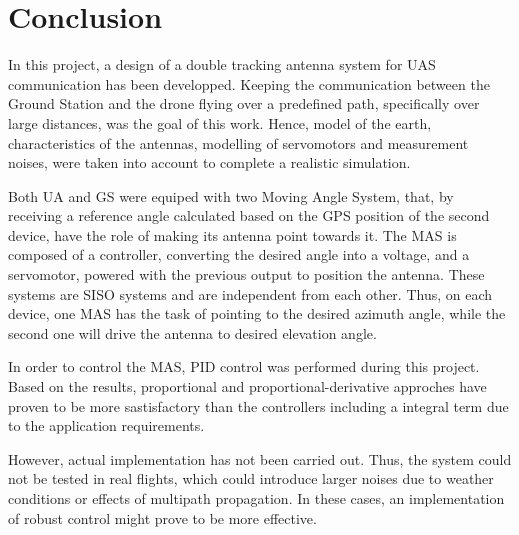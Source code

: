 \chapter{Conclusion}\label{ch:conclusion}


In this project, a design of a double tracking antenna system for UAS communication has been developped. Keeping the communication between the Ground Station and the drone flying over a predefined path, specifically over large distances, was the goal of this work. Hence, model of the earth, characteristics of the antennas, modelling of servomotors and measurement noises, were taken into account to complete a realistic simulation.

Both UA and GS were equiped with two Moving Angle System, that, by receiving a reference angle calculated based on the GPS position of the second device, have the role of making its antenna point towards it. The MAS is composed of a controller, converting the desired angle into a voltage, and a servomotor, powered with the previous output to position the antenna. These systems are SISO systems and are independent from each other. Thus, on each device, one MAS has the task of pointing to the desired azimuth angle, while the second one will drive the antenna to desired elevation angle.

In order to control the MAS, PID control was performed during this project. Based on the results, proportional and proportional-derivative approches have proven to be more sastisfactory than the controllers including a integral term due to the application requirements.



However, actual implementation has not been carried out. Thus, the system could not be tested in real flights, which could introduce larger noises due to weather conditions or effects of multipath propagation. In these cases, an implementation of robust control might prove to be more effective.


